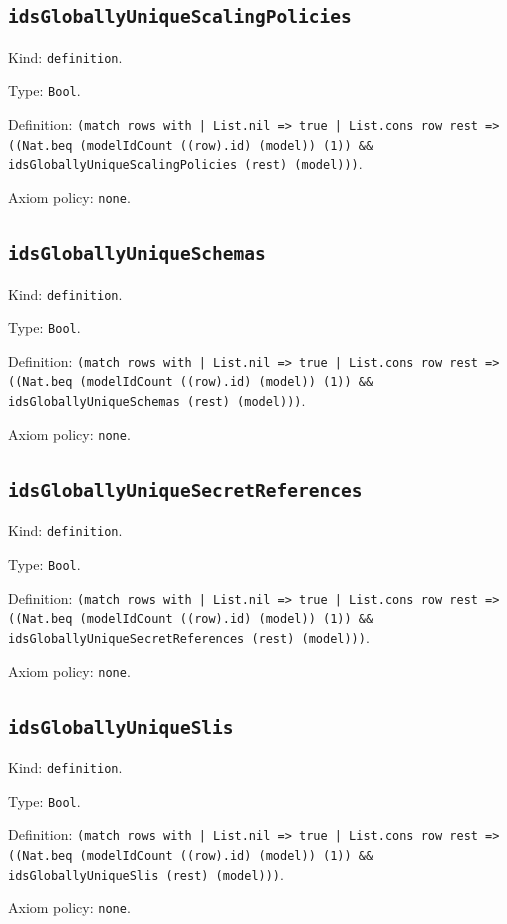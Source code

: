 \documentclass[11pt]{article}
\begin{document}
\subsection*{\texttt{idsGloballyUniqueScalingPolicies}}
\noindent Kind: \texttt{definition}.\par
\noindent Type: \texttt{Bool}.\par
\noindent Definition: \texttt{(match rows with | List.nil => true | List.cons row rest => ((Nat.beq (modelIdCount ((row).id) (model)) (1)) \&\& idsGloballyUniqueScalingPolicies (rest) (model)))}.\par
\noindent Axiom policy: \texttt{none}.\par
\subsection*{\texttt{idsGloballyUniqueSchemas}}
\noindent Kind: \texttt{definition}.\par
\noindent Type: \texttt{Bool}.\par
\noindent Definition: \texttt{(match rows with | List.nil => true | List.cons row rest => ((Nat.beq (modelIdCount ((row).id) (model)) (1)) \&\& idsGloballyUniqueSchemas (rest) (model)))}.\par
\noindent Axiom policy: \texttt{none}.\par
\subsection*{\texttt{idsGloballyUniqueSecretReferences}}
\noindent Kind: \texttt{definition}.\par
\noindent Type: \texttt{Bool}.\par
\noindent Definition: \texttt{(match rows with | List.nil => true | List.cons row rest => ((Nat.beq (modelIdCount ((row).id) (model)) (1)) \&\& idsGloballyUniqueSecretReferences (rest) (model)))}.\par
\noindent Axiom policy: \texttt{none}.\par
\subsection*{\texttt{idsGloballyUniqueSlis}}
\noindent Kind: \texttt{definition}.\par
\noindent Type: \texttt{Bool}.\par
\noindent Definition: \texttt{(match rows with | List.nil => true | List.cons row rest => ((Nat.beq (modelIdCount ((row).id) (model)) (1)) \&\& idsGloballyUniqueSlis (rest) (model)))}.\par
\noindent Axiom policy: \texttt{none}.\par
\end{document}

